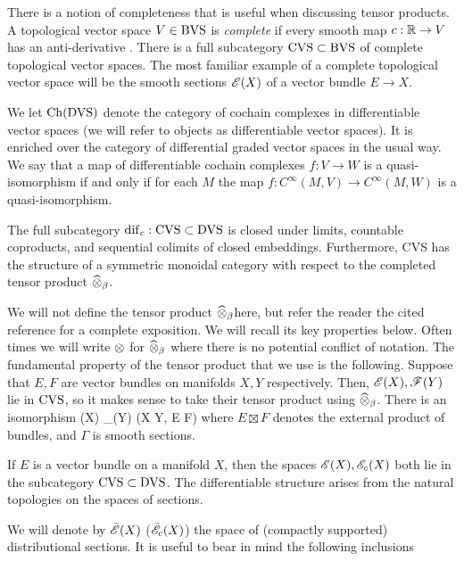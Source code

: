 \documentclass[10pt]{amsart}
\begin{document}
There is a notion of completeness that is useful when discussing tensor products. 
A topological vector space $V \in {\rm BVS}$ is {\em complete} if every smooth map $c : \mathbb R \to V$ has an anti-derivative \cite{KM97}.
There is a full subcategory ${\rm CVS} \subset {\rm BVS}$ of complete topological vector spaces.
The most familiar example of a complete topological vector space will be the smooth sections $\mathscr E(X)$ of a vector bundle $E \to X$.

We let ${\rm Ch}({\rm DVS})$ denote the category of cochain complexes in differentiable vector spaces (we will refer to objects as differentiable vector spaces). 
It is enriched over the category of differential graded vector spaces in the usual way.
We say that a map of differentiable cochain complexes $f : V \to W$ is a quasi-isomorphism if and only if for each $M$ the map $f : C^\infty(M, V) \to C^\infty(M,W)$ is a quasi-isomorphism.

\begin{thm}
The full subcategory ${\rm dif}_c : {\rm CVS} \subset {\rm DVS}$ is closed under limits, countable coproducts, and sequential colimits of closed embeddings. 
Furthermore, {\rm CVS} has the structure of a symmetric monoidal category with respect to the completed tensor product $\widehat{\otimes}_{\beta}$. 
\end{thm}

We will not define the tensor product $\widehat{\otimes}_\beta$here, but refer the reader the cited reference for a complete exposition.
We will recall its key properties below.
Often times we will write $\otimes$ for $\widehat{\otimes}_\beta$ where there is no potential conflict of notation. 
The fundamental property of the tensor product that we use is the following.
Suppose that $E,F$ are vector bundles on manifolds $X,Y$ respectively.
Then, $\mathscr E(X), \mathscr F(Y)$ lie in ${\rm CVS}$, so it makes sense to take their tensor product using $\widehat{\otimes}_\beta$. 
There is an isomorphism
\be\label{tensor1}
\sE(X) \Hat{\tensor}_\beta \sF(Y) \cong \Gamma(X \times Y, E \boxtimes F)
\ee
where $E \boxtimes F$ denotes the external product of bundles, and $\Gamma$ is smooth sections. 

If $E$ is a vector bundle on a manifold $X$, then the spaces $\mathscr E(X), \mathscr E_c(X)$ both lie in the subcategory ${\rm CVS} \subset {\rm DVS}$. 
The differentiable structure arises from the natural topologies on the spaces of sections. 

We will denote by $\Bar{\mathscr E}(X)$ ($\Bar{\mathscr E}_c(X)$) the space of (compactly supported) distributional sections.
It is useful to bear in mind the following inclusions
\ben
{}
\een
\end{document}
